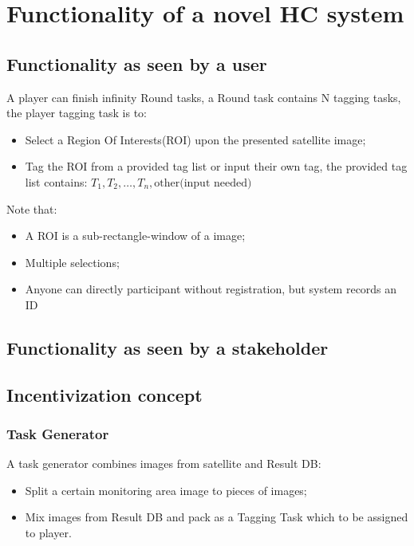 \section{Functionality of a novel HC system}
  \subsection{Functionality as seen by a user}


    A player can finish infinity Round tasks, 
    a Round task contains {N} tagging tasks, 
    the player tagging task is to:

    \begin{itemize}
      \item Select a Region Of Interests(ROI) upon the presented satellite image;
      \item Tag the ROI from a provided tag list or input their own tag, the provided tag list contains: $T_1, T_2, …, T_n, \text{other(input needed)}$
    \end{itemize}

    Note that:

    \begin{itemize}
      \item A ROI is a sub-rectangle-window of a image;
      \item Multiple selections;
      \item Anyone can directly participant without registration, but system records an ID
    \end{itemize}

  \subsection{Functionality as seen by a stakeholder}
  \subsection{Incentivization concept}

      \subsubsection{Task Generator}

    A task generator combines images from satellite and Result DB:

    \begin{itemize}
      \item Split a certain monitoring area image to pieces of images;
      \item Mix images from Result DB and pack as a Tagging Task which to be assigned to player.
    \end{itemize}

